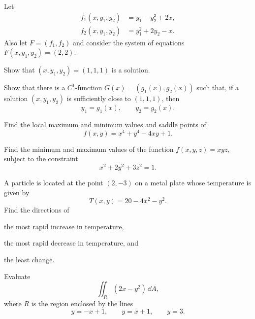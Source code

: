 \begin{problem}
Let
\[
\begin{aligned}
f_1(x, y_1, y_2)&=y_1-y_2^3+2x, \\
f_2(x, y_1, y_2)&=y_1^2+2y_2-x.
\end{aligned}
\]
Also let $F=(f_1, f_2)$ and consider the system of equations $F(x, y_1, y_2)=(2, 2)$.
\begin{problemsubparts}
\item Show that $(x, y_1, y_2)=(1, 1, 1)$ is a solution.
\item Show that there is a $C^1$-function $G(x)=(g_1(x), g_2(x))$ such that, if a solution $(x, y_1, y_2)$ is sufficiently close to $(1, 1, 1)$, then
\[
y_1=g_1(x),\qquad y_2=g_2(x).
\]
\end{problemsubparts}
\end{problem}

\begin{problem}
Find the local maximum and minimum values and saddle points of
\[
f(x, y)=x^4+y^4-4xy+1.
\]
\end{problem}

\begin{problem}
Find the minimum and maximum values of the function $f(x, y, z)=xyz$, subject to the constraint
\[
x^2+2y^2+3z^2=1.
\]
\end{problem}

\schoolsection{\KAIST}{\KoreaAdvancedInstituteOfScienceAndTechnology}

\begin{problem}
A particle is located at the point $(2, -3)$ on a metal plate whose temperature is given by
\[
T(x, y)=20-4x^2-y^2.
\]
Find the directions of
\begin{problemsubparts}
\item the most rapid increase in temperature,
\item the most rapid decrease in temperature, and
\item the least change.
\end{problemsubparts}
\end{problem}

\begin{problem}
Evaluate
\[
\iint_R (2x-y^2)\,\dd A,
\]
where $R$ is the region enclosed by the lines
\[
y=-x+1,
\qquad
y=x+1,
\qquad
y=3.
\]
\end{problem}

